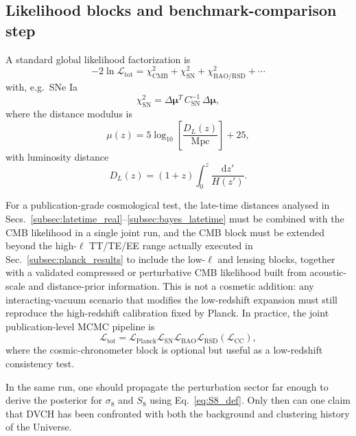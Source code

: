 \documentclass[pdflatex,sn-mathphys-num]{sn-jnl}%
\newcommand{\dd}{\mathrm{d}}
\begin{document}
\subsection{Likelihood blocks and benchmark-comparison step}
\label{subsec:likelihood}

A standard global likelihood factorization is
\begin{equation}
-2\ln\mathcal{L}_{\mathrm{tot}}
=
\chi^2_{\mathrm{CMB}}
+\chi^2_{\mathrm{SN}}
+\chi^2_{\mathrm{BAO/RSD}}
+\cdots
\end{equation}
with, e.g.\ SNe Ia
\begin{equation}
\chi^2_{\mathrm{SN}} = \Delta\bm{\mu}^{T}\,C_{\mathrm{SN}}^{-1}\,\Delta\bm{\mu},
\end{equation}
where the distance modulus is
\begin{equation}
\mu(z)=5\log_{10}\!\left[\frac{D_L(z)}{\mathrm{Mpc}}\right]+25,
\end{equation}
with luminosity distance
\begin{equation}
D_L(z)=(1+z)\int_0^z \frac{\dd z'}{H(z')}.
\end{equation}

For a publication-grade cosmological test, the late-time distances analysed in
Secs.~\ref{subsec:latetime_real}--\ref{subsec:bayes_latetime} must be combined
with the CMB likelihood in a single joint run, and the CMB block must be
extended beyond the high-$\ell$ TT/TE/EE range actually executed in
Sec.~\ref{subsec:planck_results} to include the low-$\ell$ and lensing blocks,
together with a validated compressed or perturbative CMB likelihood built from
acoustic-scale and distance-prior information. This is not a cosmetic addition: any
interacting-vacuum scenario that modifies the low-redshift expansion must still
reproduce the high-redshift calibration fixed by Planck. In practice, the joint
publication-level MCMC pipeline is
\begin{equation}
\mathcal{L}_{\mathrm{tot}}=
\mathcal{L}_{\mathrm{Planck}}
\mathcal{L}_{\mathrm{SN}}
\mathcal{L}_{\mathrm{BAO}}
\mathcal{L}_{\mathrm{RSD}}
(\mathcal{L}_{\mathrm{CC}}),
\end{equation}
where the cosmic-chronometer block is optional but useful as a low-redshift
consistency test.

In the same run, one should propagate the perturbation sector far enough to
derive the posterior for $\sigma_8$ and $S_8$ using Eq.~\eqref{eq:S8_def}.
Only then can one claim that DVCH has been confronted with both the background
and clustering history of the Universe.
\end{document}
